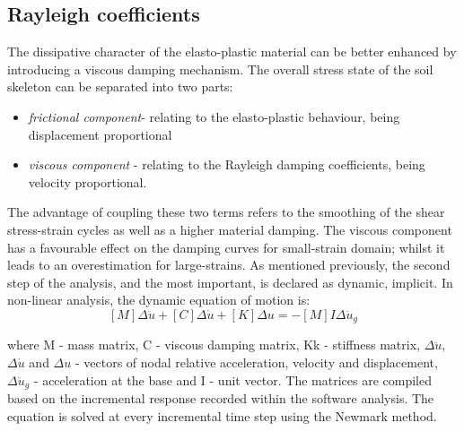 	\subsection{Rayleigh coefficients}
	The dissipative character of the elasto-plastic material can be better enhanced by introducing a viscous damping mechanism. The overall stress state of the soil skeleton can be separated into two parts: 
	\begin{itemize}
		\item \textit{frictional component}- relating to the elasto-plastic behaviour, being displacement proportional
		\item \textit{viscous component} - relating to the Rayleigh damping coefficients, being velocity proportional. 
	\end{itemize}
	
	The advantage of coupling these two terms refers to the smoothing of the shear stress-strain cycles as well as a higher material damping. The viscous component has a favourable effect on the damping curves for small-strain domain; whilst it leads to an overestimation for large-strains. 
	As mentioned previously, the second step of the analysis, and the most important, is declared as dynamic, implicit. In non-linear analysis, the dynamic equation of motion is:
	\begin{equation}
	\left[M\right]{\Delta \ddot{u}}+\left[C\right]{\Delta \dot{u}}+\left[K\right]\Delta{u}=-\left[M\right]{I}\Delta\ddot{u}_g
	\end{equation}
	
	where \gls{M} - mass matrix, \gls{C} - viscous damping matrix, \gls{Kk} - stiffness matrix, $\Delta \ddot{u}$, $\Delta \dot{u}$ and $\Delta{u}$ - vectors of nodal relative acceleration, velocity and displacement, $\Delta \ddot{u}_g$ - acceleration at the base and {I} - unit vector. The matrices are compiled based on the incremental response recorded within the software analysis. The equation is solved at every incremental time step using the Newmark \cite{newmark1959method} method.
	
